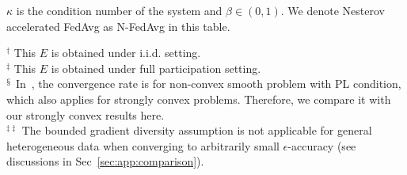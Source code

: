 \begin{table}[h!]
{$\kappa$ is the condition number of the system and $\beta \in (0,1)$. We denote Nesterov accelerated FedAvg as N-FedAvg in this table.}
{\raggedright 
         $^{\dagger}$ This $E$ is obtained under i.i.d. setting. \\
         $^{\ddagger}$ This $E$ is obtained under full participation setting. \\ 
         $^{\mathsection}$ In~\cite{haddadpour2019convergence}, the convergence rate is for non-convex smooth problem with PL condition, which also applies for strongly convex problems. Therefore, we compare it with our strongly convex results here. \\
         $^{\ddagger\ddagger}$ The bounded gradient diversity assumption is not applicable for general heterogeneous data when converging to arbitrarily small $\epsilon$-accuracy (see discussions in Sec~\ref{sec:app:comparison}).
           \par}
\label{tb:convergenceratev3}
\end{table}



